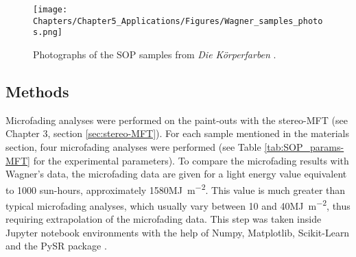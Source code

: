 \begin{figure*}[!h]
\centering
\texttt{[image: Chapters/Chapter5\_Applications/Figures/Wagner\_samples\_photos.png]}
\caption[\hspace{0.3cm}Photographs of the synthetic organic paint samples]{Photographs of the \gls{SOP} samples from \textit{Die Körperfarben} \citep[401 ; 449]{wagner_korperfarben_1928}.}
\label{fig:SOP_photo_samples}
\end{figure*}

\subsection{Methods}


Microfading analyses were performed on the paint-outs with the stereo-MFT (see Chapter 3, section \ref{sec:stereo-MFT}). For each sample mentioned in the materials section, four microfading analyses were performed (see Table \ref{tab:SOP_params-MFT} for the experimental parameters). To compare the microfading results with Wagner’s data, the microfading data are given for a light energy value equivalent to 1000 sun-hours, \ie approximately 1580\unit{\mega\joule\per\square\metre}. This value is much greater than typical microfading analyses, which usually vary between 10 and 40\unit{\mega\joule\per\square\metre}, thus requiring extrapolation of the microfading data. This step was taken inside Jupyter notebook environments \citep{kluyver_jupyter_2016} with the help of Numpy, Matplotlib, Scikit-Learn and the PySR package \citep{harris_array_2020, pedregosa_scikit-learn_2011, hunter_matplotlib_2007, cranmer_pysr_2020}.\\


